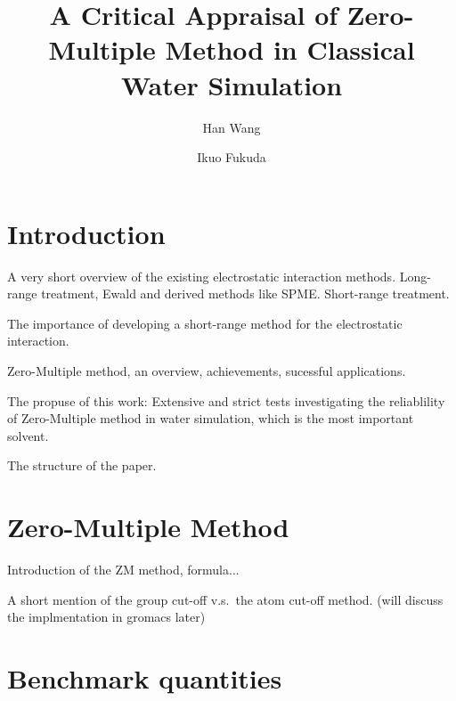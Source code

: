\documentclass[aip,jcp,a4paper,preprint,unsortedaddress,onecolumn,fleqn]{revtex4-1}
\begin{document}
\title{A Critical Appraisal of Zero-Multiple Method in Classical Water Simulation}
\author{Han Wang}
\author{Ikuo Fukuda}

\begin{abstract}
\end{abstract}

\maketitle

\section{Introduction}

A very short overview of the existing electrostatic interaction methods.
Long-range treatment, Ewald and derived methods like SPME.
Short-range treatment.

The importance of developing a short-range method for the electrostatic interaction.

Zero-Multiple method, an overview, achievements, sucessful applications.

The propuse of this work: Extensive and strict tests investigating the reliablility of Zero-Multiple method in water simulation, which is the most important solvent.

The structure of the paper.

\section{Zero-Multiple Method}

Introduction of the ZM method, formula...

A short mention of the group cut-off v.s.~the atom cut-off method. (will discuss the implmentation in gromacs later)



\section{Benchmark quantities}
\end{document}
